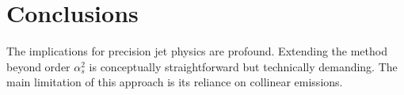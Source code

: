 \section{Conclusions}\label{sec:conclusions}

The implications for precision jet physics are profound. Extending the
method beyond order $\alpha_s^2$ is conceptually straightforward but
technically demanding. The main limitation of this approach is its
reliance on collinear emissions.

